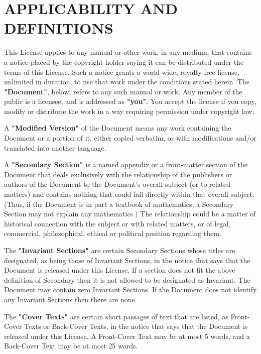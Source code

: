 \documentclass{stacks-project-book}
\theoremstyle{plain}
\theoremstyle{definition}
\theoremstyle{remark}
\numberwithin{equation}{subsection}
\begin{document}
\section{APPLICABILITY AND DEFINITIONS}
\label{fdl-section-applicability-and-definitions}

This License applies to any manual or other work, in any medium, that
contains a notice placed by the copyright holder saying it can be
distributed under the terms of this License.  Such a notice grants a
world-wide, royalty-free license, unlimited in duration, to use that
work under the conditions stated herein.  The \textbf{"Document"}, below,
refers to any such manual or work.  Any member of the public is a
licensee, and is addressed as \textbf{"you"}.  You accept the license if you
copy, modify or distribute the work in a way requiring permission
under copyright law.

A \textbf{"Modified Version"} of the Document means any work containing the
Document or a portion of it, either copied verbatim, or with
modifications and/or translated into another language.

A \textbf{"Secondary Section"} is a named appendix or a front-matter section of
the Document that deals exclusively with the relationship of the
publishers or authors of the Document to the Document's overall subject
(or to related matters) and contains nothing that could fall directly
within that overall subject.  (Thus, if the Document is in part a
textbook of mathematics, a Secondary Section may not explain any
mathematics.)  The relationship could be a matter of historical
connection with the subject or with related matters, or of legal,
commercial, philosophical, ethical or political position regarding
them.

The \textbf{"Invariant Sections"} are certain Secondary Sections whose titles
are designated, as being those of Invariant Sections, in the notice
that says that the Document is released under this License.  If a
section does not fit the above definition of Secondary then it is not
allowed to be designated as Invariant.  The Document may contain zero
Invariant Sections.  If the Document does not identify any Invariant
Sections then there are none.

The \textbf{"Cover Texts"} are certain short passages of text that are listed,
as Front-Cover Texts or Back-Cover Texts, in the notice that says that
the Document is released under this License.  A Front-Cover Text may
be at most 5 words, and a Back-Cover Text may be at most 25 words.
\end{document}
